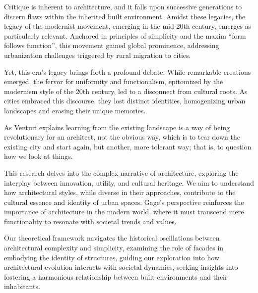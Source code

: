 Critique is inherent to architecture, and it falls upon successive generations to discern flaws within the inherited built environment.
Amidst these legacies, the legacy of the modernist movement, emerging in the mid-20th century, emerges as particularly relevant.
Anchored in principles of simplicity and the maxim ``form follows function'', this movement gained global prominence, addressing urbanization challenges triggered by rural migration to cities.

Yet, this era's legacy brings forth a profound debate.
While remarkable creations emerged, the fervor for uniformity and functionalism, epitomized by the modernism style of the 20th century, led to a disconnect from cultural roots.
As cities embraced this discourse, they lost distinct identities, homogenizing urban landscapes and erasing their unique memories.

As Venturi\cite{Venturi1972} explains learning from  the existing landscape  is  a  way of being revolutionary for  an  architect, not the obvious way, which is to tear down the existing city and start again, but another, more tolerant way;
that is, to question how we look at things.

This research delves into the complex narrative of architecture, exploring the interplay between innovation, utility, and cultural heritage.
We aim to understand how architectural styles, while diverse in their approaches, contribute to the cultural essence and identity of urban spaces.
Gage's\cite{Gage2015} perspective reinforces the importance of architecture in the modern world, where it must transcend mere functionality to resonate with societal trends and values.

Our theoretical framework navigates the historical oscillations between architectural complexity and simplicity, examining the role of facades in embodying the identity of structures, guiding our exploration into how architectural evolution interacts with societal dynamics, seeking insights into fostering a harmonious relationship between built environments and their inhabitants.



